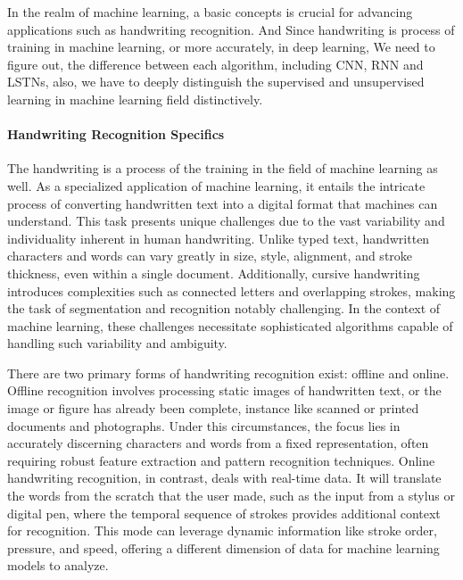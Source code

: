 \documentclass[12pt]{article}
\begin{document}
In the realm of machine learning, a basic concepts is crucial for advancing applications such as handwriting recognition. And Since handwriting is process of training in machine learning, or more accurately, in deep learning, We need to figure out, the difference between each algorithm, including CNN, RNN and LSTNs, also, we have to deeply distinguish the supervised and unsupervised learning in machine learning field distinctively.

\paragraph{Handwriting Recognition Specifics}
The handwriting is a process of the training in the field of machine learning as well. As a specialized application of machine learning, it entails the intricate process of converting handwritten text into a digital format that machines can understand. This task presents unique challenges due to the vast variability and individuality inherent in human handwriting. Unlike typed text, handwritten characters and words can vary greatly in size, style, alignment, and stroke thickness, even within a single document. Additionally, cursive handwriting introduces complexities such as connected letters and overlapping strokes, making the task of segmentation and recognition notably challenging. In the context of machine learning, these challenges necessitate sophisticated algorithms capable of handling such variability and ambiguity.

There are two primary forms of handwriting recognition exist: offline and online\cite{OF}. Offline recognition involves processing static images of handwritten text, or the image or figure has already been complete, instance like scanned or printed documents and photographs. Under this circumstances, the focus lies in accurately discerning characters and words from a fixed representation, often requiring robust feature extraction and pattern recognition techniques. Online handwriting recognition, in contrast, deals with real-time data. It will translate the words from the scratch that the user made, such as the input from a stylus or digital pen, where the temporal sequence of strokes provides additional context for recognition. This mode can leverage dynamic information like stroke order, pressure, and speed, offering a different dimension of data for machine learning models to analyze.
\end{document}
